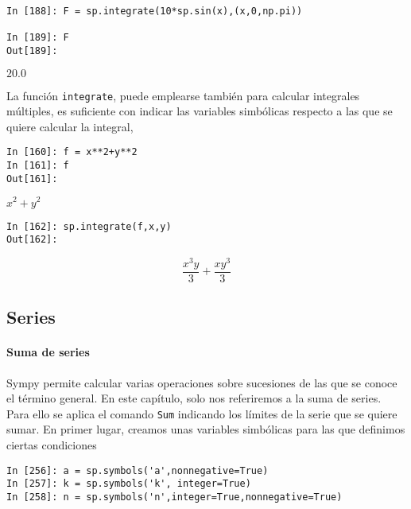 \begin{center}
	\begin{minipage}{.5\textwidth}
	\begin{verbatim}
In [188]: F = sp.integrate(10*sp.sin(x),(x,0,np.pi))

In [189]: F
Out[189]:   
		\end{verbatim}
		$20.0$
	\end{minipage}
\end{center}
\begin{paracol}{2}
	La función \texttt{integrate}, puede emplearse también para calcular integrales múltiples, es suficiente con indicar las variables simbólicas respecto a las que se quiere calcular la integral,
\end{paracol}

\begin{center}
	\begin{minipage}{.5\textwidth}
		\begin{verbatim}
In [160]: f = x**2+y**2
In [161]: f
Out[161]: 
		\end{verbatim}
		$x^2+y^2$
		\begin{verbatim}
In [162]: sp.integrate(f,x,y)
Out[162]: 
		\end{verbatim}
		\begin{equation*}
			\frac{x^3y}{3}+\frac{xy^3}{3}
		\end{equation*}
	\end{minipage}
\end{center}

\begin{paracol}{2}
\subsection{Series} 

\paragraph{Suma de series} Sympy permite calcular varias operaciones sobre sucesiones de las que se conoce el término general. En este capítulo, solo nos referiremos a la suma de series. 
Para ello se aplica el comando \texttt{Sum} indicando los límites de la serie que se quiere sumar. En primer lugar, creamos unas variables simbólicas para las que definimos ciertas condiciones
\end{paracol}
\begin{center}
	\begin{minipage}{.7\textwidth}
		\begin{verbatim}
In [256]: a = sp.symbols('a',nonnegative=True)
In [257]: k = sp.symbols('k', integer=True)
In [258]: n = sp.symbols('n',integer=True,nonnegative=True)
		\end{verbatim}
	\end{minipage}
\end{center}

